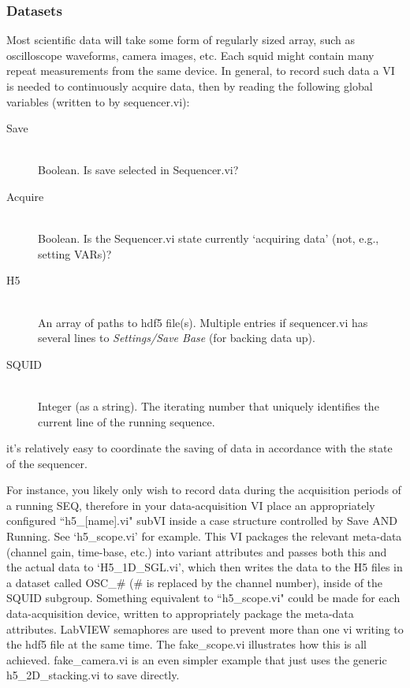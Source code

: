 \documentclass[10pt,a4paper]{article}
\begin{document}
\subsubsection{Datasets}
Most scientific data will take some form of regularly sized array, such as oscilloscope waveforms, camera images, etc.  Each squid might contain many repeat measurements from the same device. In general, to record such data a VI is needed to continuously acquire data, then by reading the following global variables (written to by sequencer.vi):
\begin{description}
	\item[Save] \hfill \\
	Boolean. Is save selected in Sequencer.vi?
	\item[Acquire] \hfill \\
	Boolean. Is the Sequencer.vi state currently `acquiring data' (not, e.g., setting VARs)?
	\item[H5] \hfill \\	
	An array of paths to hdf5 file(s).   Multiple entries if sequencer.vi has several lines to \emph{Settings/Save Base} (for backing data up).
	\item[SQUID] \hfill \\
	Integer (as a string). The iterating number that uniquely identifies the current line of the running sequence.

\end{description}
it's relatively easy to coordinate the saving of data in accordance with the state of the sequencer.

For instance, you likely only wish to record data during the acquisition periods of a running SEQ, therefore in your data-acquisition VI place an appropriately configured ``h5\_[name].vi" subVI inside a case structure controlled by Save AND Running.  See `h5\_scope.vi' for example.  This VI packages the relevant meta-data (channel gain, time-base, etc.) into variant attributes and passes both this and the actual data to `H5\_1D\_SGL.vi', which then writes the data to the H5 files in a dataset called OSC\_\# (\# is replaced by the channel number), inside of the SQUID subgroup.  Something equivalent to ``h5\_scope.vi" could be made for each data-acquisition device, written to appropriately package the meta-data attributes.  LabVIEW semaphores are used to prevent more than one vi writing to the hdf5 file at the same time.  The fake\_scope.vi illustrates how this is all achieved.  fake\_camera.vi is an even simpler example that just uses the generic h5\_2D\_stacking.vi to save directly.
\end{document}

